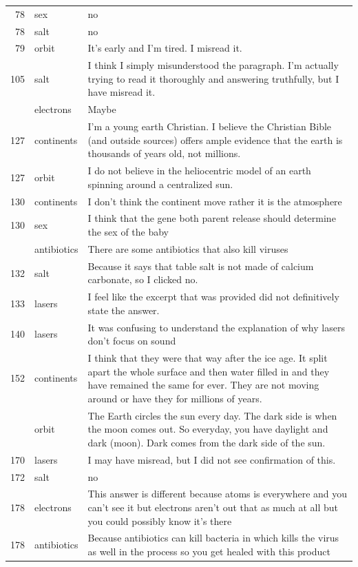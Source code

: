 \documentclass[
  doc,floatsintext]{apa6}
\begin{document}
\begin{longtable}[t]{>{}r>{}l>{\raggedright\arraybackslash}p{30em}}
78 & sex & no\\
78 & salt & no\\
79 & orbit & It’s early and I’m tired. I misread it.\\
105 & salt & I think I simply misunderstood the paragraph. I'm actually trying to read it thoroughly and answering truthfully, but I have misread it.\\
\addlinespace
109 & electrons & Maybe\\
127 & continents & I'm a young earth Christian. I believe the Christian Bible (and outside sources) offers ample evidence that the earth is thousands of years old, not millions.\\
127 & orbit & I do not believe in the heliocentric model of an earth spinning around a centralized sun.\\
130 & continents & I don't think the continent move rather it is the atmosphere\\
130 & sex & I think that the gene both parent release should determine the sex of the baby\\
\addlinespace
131 & antibiotics & There are some antibiotics that also kill viruses\\
132 & salt & Because it says that table salt is not made of calcium carbonate, so I clicked no.\\
133 & lasers & I feel like the excerpt that was provided did not definitively state the answer.\\
140 & lasers & It was confusing to understand the explanation of why lasers don’t focus on sound\\
152 & continents & I think that they were that way after the ice age.  It split apart the whole surface and then water filled in and they have remained the same for ever.  They are not moving around or have they for millions of years.\\
\addlinespace
152 & orbit & The  Earth circles the sun every day.  The dark side is when the moon comes out.  So everyday, you have daylight and dark (moon).  Dark comes from the dark side of the sun.\\
170 & lasers & I may have misread, but I did not see confirmation of this.\\
172 & salt & no\\
178 & electrons & This answer is different because atoms is everywhere and you can't see it but electrons aren't out that as much at all but you could possibly know it's there\\
178 & antibiotics & Because antibiotics can kill bacteria in which kills the virus as well in the process so you get healed with this product\\

\end{longtable}
\end{document}

